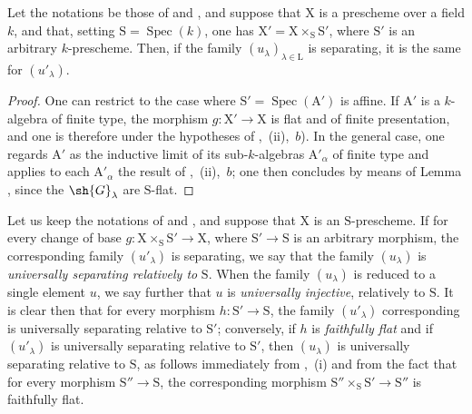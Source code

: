 \begin{proposition}[11.9.13]
\label{IV.11.9.13}
Let the notations be those of  and , and suppose that $\mathrm{X}$ is a prescheme over a field $k$, and that, setting $\mathrm{S}=\operatorname{Spec}(k)$, one has $\mathrm{X}'=\mathrm{X}\times_\mathrm{S}\mathrm{S}'$, where $\mathrm{S}'$ is an arbitrary $k$-prescheme.
Then, if the family $(u_\lambda)_{\lambda\in\mathrm{L}}$ is separating, it is the same for $(u'_\lambda)$.
\end{proposition}

\begin{proof}
One can restrict to the case where $\mathrm{S}'=\operatorname{Spec}(\mathrm{A}')$ is affine.
If $\mathrm{A}'$ is a $k$-algebra of finite type, the morphism $g:\mathrm{X}'\to\mathrm{X}$ is flat and of finite presentation, and one is therefore under the hypotheses of ,~(ii),~$b$).
In the general case, one regards $\mathrm{A}'$ as the inductive limit of its sub-$k$-algebras $\mathrm{A}'_\alpha$ of finite type and applies to each $\mathrm{A}'_\alpha$ the result of ,~(ii),~$b$; one then concludes by means of Lemma , since the $\sh{G}_\lambda$ are $\mathrm{S}$-flat.
\end{proof}

\begin{env}[11.9.14]
\label{IV.11.9.14}
Let us keep the notations of  and , and suppose that $\mathrm{X}$ is an $\mathrm{S}$-prescheme.
If for every change of base $g:\mathrm{X}\times_\mathrm{S}\mathrm{S}'\to\mathrm{X}$, where $\mathrm{S}'\to\mathrm{S}$ is an arbitrary morphism, the corresponding family $(u'_\lambda)$ is separating, we say that the family $(u_\lambda)$ is \emph{universally separating relatively to} $\mathrm{S}$.
When the family $(u_\lambda)$ is reduced to a single element $u$, we say further that $u$ is \emph{universally injective}, relatively to $\mathrm{S}$.
It is clear then that for every morphism $h:\mathrm{S}'\to\mathrm{S}$, the family $(u'_\lambda)$ corresponding is universally separating relative to $\mathrm{S}'$; conversely, if $h$ is \emph{faithfully flat} and if $(u'_\lambda)$ is universally separating relative to $\mathrm{S}'$, then $(u_\lambda)$ is universally separating relative to $\mathrm{S}$, as follows immediately from ,~(i) and from the fact that for every morphism $\mathrm{S}''\to\mathrm{S}$, the corresponding morphism $\mathrm{S}''\times_\mathrm{S}\mathrm{S}'\to\mathrm{S}''$ is faithfully flat.
\end{env}

